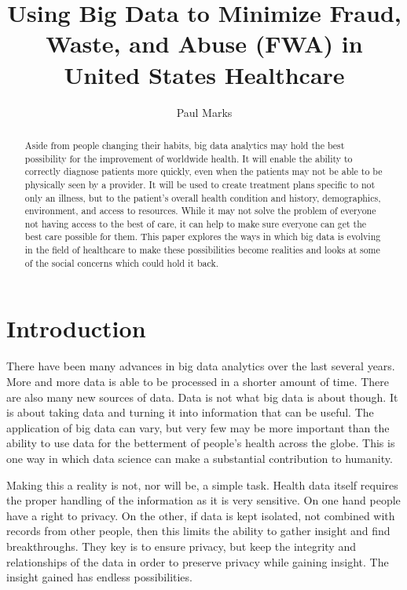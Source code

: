 \documentclass[sigconf]{acmart}
\begin{document}
\title{Using Big Data to Minimize Fraud, Waste, and Abuse (FWA) in United States Healthcare}


\author{Paul Marks}


\begin{abstract}
Aside from people changing their habits, big data analytics
may hold the best possibility for the improvement of
worldwide health.  It will enable the ability to correctly
diagnose patients more quickly, even when the patients may
not be able to be physically seen by a provider.  It will
be used to create treatment plans specific to not only an
illness, but to the patient's overall health condition and
history, demographics, environment, and access to resources.
While it may not solve the problem of everyone not having
access to the best of care, it can help to make sure everyone
can get the best care possible for them.  This paper explores
the ways in which big data is evolving in the field of
healthcare to make these possibilities become realities and
looks at some of the social concerns which could hold it back.
\end{abstract}



\maketitle

\section{Introduction}
There have been many advances in big data analytics over the last 
several years.  More and more data is able to be processed in a 
shorter amount of time.  There are also many new sources of data.  
Data is not what big data is about though.  It is about taking 
data and turning it into information that can be useful.  The 
application of big data can vary, but very few may be more 
important than the ability to use data for the betterment of 
people's health across the globe.  This is one way in which data 
science can make a substantial contribution to humanity.

Making this a reality is not, nor will be, a simple task.  Health 
data itself requires the proper handling of the information as 
it is very sensitive.  On one hand people have a right to privacy.  
On the other, if data is kept isolated, not combined with records 
from other people, then this limits the ability to gather insight 
and find breakthroughs.  They key is to ensure privacy, but keep 
the integrity and relationships of the data in order to preserve 
privacy while gaining insight.  The insight gained has endless 
possibilities.
\end{document}
